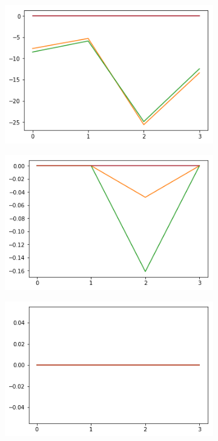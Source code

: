 \begin{figure}[h!]
  \begin{subfigure}[b]{0.3\linewidth}
    \includegraphics[width=\linewidth]{images/subst2/ef0_means_neg.png}
    \caption{}
  \end{subfigure}
  \begin{subfigure}[b]{0.3\linewidth}
    \includegraphics[width=\linewidth]{images/subst2/ef1_means_neg.png}
    \caption{}
  \end{subfigure}
  \begin{subfigure}[b]{0.3\linewidth}
    \includegraphics[width=\linewidth]{images/subst2/ef2_means_neg.png}

\end{subfigure}
\end{figure}
